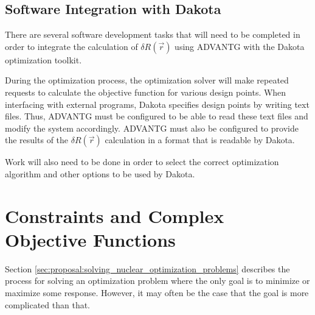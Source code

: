 \subsection{Software Integration with Dakota}
\label{sec:proposal:software_integration_with_dakota}

There are several software development tasks that will need to be completed in order to integrate the calculation of $\delta R\left(\vec{r}\right)$ using ADVANTG with the Dakota optimization toolkit.

During the optimization process, the optimization solver will make repeated requests to calculate the objective function for various design points.
When interfacing with external programs, Dakota specifies design points by writing text files.
Thus, ADVANTG must be configured to be able to read these text files and modify the system accordingly.
ADVANTG must also be configured to provide the results of the $\delta R\left(\vec{r}\right)$ calculation in a format that is readable by Dakota.

Work will also need to be done in order to select the correct optimization algorithm and other options to be used by Dakota.

\section{Constraints and Complex Objective Functions}
\label{sec:proposal:constraints_and_complex_objective_functions}

Section \ref{sec:proposal:solving_nuclear_optimization_problems} describes the process for solving an optimization problem where the only goal is to minimize or maximize some response.
However, it may often be the case that the goal is more complicated than that.

